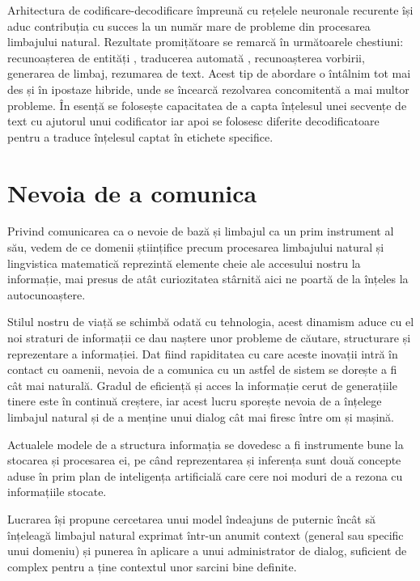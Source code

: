 Arhitectura de codificare-decodificare împreună cu rețelele neuronale recurente își aduc contribuția cu succes la un număr mare de probleme din procesarea limbajului natural. Rezultate promițătoare se remarcă în următoarele chestiuni: recunoașterea de entități \cite{mesnil-rnn-crf}, traducerea automată  \cite{luoung_bahdanau_maning}, recunoașterea vorbirii, generarea de limbaj, rezumarea de text. Acest tip de abordare o întâlnim tot mai des și în ipostaze hibride, unde se încearcă rezolvarea concomitentă a mai multor probleme. În esență se folosește capacitatea de a capta înțelesul unei secvențe de text cu ajutorul unui codificator iar apoi se folosesc diferite decodificatoare pentru a traduce înțelesul captat în etichete specifice.

\section{Nevoia de a comunica}

Privind comunicarea ca o nevoie de bază și limbajul ca un prim instrument al său, vedem de ce domenii științifice precum procesarea limbajului natural și lingvistica matematică reprezintă elemente cheie ale accesului nostru la informație, mai presus de atât curiozitatea stârnită aici ne poartă de la înțeles la autocunoaștere.

Stilul nostru de viață se schimbă odată cu tehnologia, acest dinamism aduce cu el noi straturi de informații ce dau naștere unor probleme de căutare, structurare și reprezentare a informației. Dat fiind rapiditatea cu care aceste inovații intră în contact cu oamenii, nevoia de a comunica cu un astfel de sistem se dorește a fi cât mai naturală. Gradul de eficiență și acces la informație cerut de generațiile tinere este în continuă creștere, iar acest lucru sporește nevoia de a înțelege limbajul natural și de a menține unui dialog cât mai firesc între om și mașină.

Actualele modele de a structura informația se dovedesc a fi instrumente bune la stocarea și procesarea ei, pe când reprezentarea și inferența sunt două concepte aduse în prim plan de inteligența artificială care cere noi moduri de a rezona cu informațiile stocate.

Lucrarea își propune cercetarea unui model îndeajuns de puternic încât să înțeleagă limbajul natural exprimat într-un anumit context (general sau specific unui domeniu) și punerea în aplicare a unui administrator de dialog, suficient de complex pentru a ține contextul unor sarcini bine definite.

